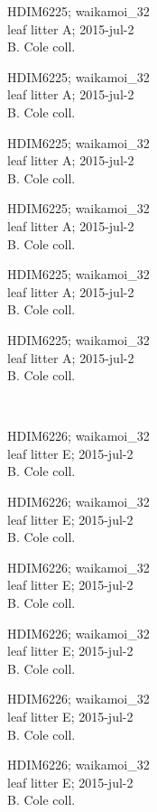\documentclass[2pt]{extarticle}
\begin{document}
\noindent
\parbox{0.16\textwidth}{\tiny \raggedright \rule[-0.3\baselineskip]{0pt}{10pt}HDIM6225; waikamoi\_32\\ leaf litter A; 2015-jul-2\\ B. Cole coll.}
\parbox{0.16\textwidth}{\tiny \raggedright \rule[-0.3\baselineskip]{0pt}{10pt}HDIM6225; waikamoi\_32\\ leaf litter A; 2015-jul-2\\ B. Cole coll.}
\parbox{0.16\textwidth}{\tiny \raggedright \rule[-0.3\baselineskip]{0pt}{10pt}HDIM6225; waikamoi\_32\\ leaf litter A; 2015-jul-2\\ B. Cole coll.}
\parbox{0.16\textwidth}{\tiny \raggedright \rule[-0.3\baselineskip]{0pt}{10pt}HDIM6225; waikamoi\_32\\ leaf litter A; 2015-jul-2\\ B. Cole coll.}
\parbox{0.16\textwidth}{\tiny \raggedright \rule[-0.3\baselineskip]{0pt}{10pt}HDIM6225; waikamoi\_32\\ leaf litter A; 2015-jul-2\\ B. Cole coll.}
\parbox{0.16\textwidth}{\tiny \raggedright \rule[-0.3\baselineskip]{0pt}{10pt}HDIM6225; waikamoi\_32\\ leaf litter A; 2015-jul-2\\ B. Cole coll.} \\ 
\vspace{0.001in} 

\noindent
\parbox{0.16\textwidth}{\tiny \raggedright \rule[-0.3\baselineskip]{0pt}{10pt}HDIM6226; waikamoi\_32\\ leaf litter E; 2015-jul-2\\ B. Cole coll.}
\parbox{0.16\textwidth}{\tiny \raggedright \rule[-0.3\baselineskip]{0pt}{10pt}HDIM6226; waikamoi\_32\\ leaf litter E; 2015-jul-2\\ B. Cole coll.}
\parbox{0.16\textwidth}{\tiny \raggedright \rule[-0.3\baselineskip]{0pt}{10pt}HDIM6226; waikamoi\_32\\ leaf litter E; 2015-jul-2\\ B. Cole coll.}
\parbox{0.16\textwidth}{\tiny \raggedright \rule[-0.3\baselineskip]{0pt}{10pt}HDIM6226; waikamoi\_32\\ leaf litter E; 2015-jul-2\\ B. Cole coll.}
\parbox{0.16\textwidth}{\tiny \raggedright \rule[-0.3\baselineskip]{0pt}{10pt}HDIM6226; waikamoi\_32\\ leaf litter E; 2015-jul-2\\ B. Cole coll.}
\parbox{0.16\textwidth}{\tiny \raggedright \rule[-0.3\baselineskip]{0pt}{10pt}HDIM6226; waikamoi\_32\\ leaf litter E; 2015-jul-2\\ B. Cole coll.} \\ 
\vspace{0.001in} 
\end{document}
